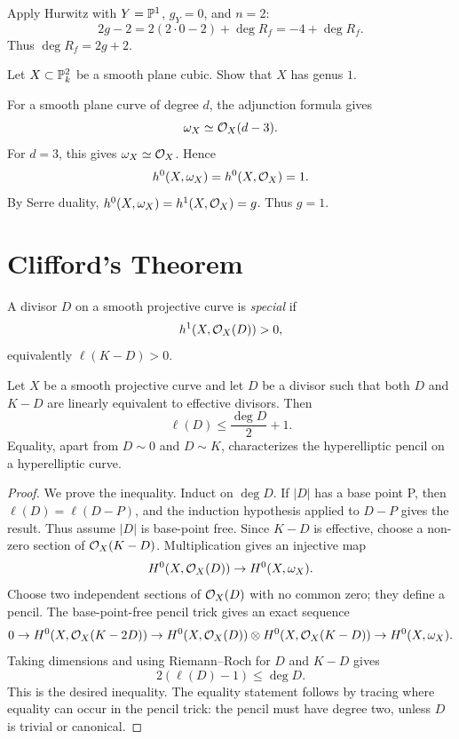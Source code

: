 \begin{solution}
Apply Hurwitz with \(Y=\mathbb{P}^1\), \(g_Y=0\), and \(n=2\):
\[
    2g-2=2(2\cdot0-2)+\deg R_f=-4+\deg R_f.
\]
Thus \(\deg R_f=2g+2\).
\end{solution}

\begin{exercise}\label{ex:plane-cubic-genus}
Let \(X\subset\mathbb{P}^2_k\) be a smooth plane cubic.  Show that \(X\) has genus
\(1\).
\end{exercise}

\begin{solution}
For a smooth plane curve of degree \(d\), the adjunction formula gives
\[
    \omega_X\simeq \mathcal{O}_X(d-3).
\]
For \(d=3\), this gives \(\omega_X\simeq\mathcal{O}_X\).  Hence
\[
    h^0(X,\omega_X)=h^0(X,\mathcal{O}_X)=1.
\]
By Serre duality, \(h^0(X,\omega_X)=h^1(X,\mathcal{O}_X)=g\).  Thus \(g=1\).
\end{solution}

\section{Clifford's Theorem}

\begin{definition}
A divisor \(D\) on a smooth projective curve is \emph{special} if
\[
    h^1(X,\mathcal{O}_X(D))>0,
\]
equivalently \(\ell(K-D)>0\).
\end{definition}

\begin{theorem}[Clifford]
Let \(X\) be a smooth projective curve and let \(D\) be a divisor such that
both \(D\) and \(K-D\) are linearly equivalent to effective divisors.  Then
\[
    \ell(D)\le \frac{\deg D}{2}+1.
\]
Equality, apart from \(D\sim0\) and \(D\sim K\), characterizes the
hyperelliptic pencil on a hyperelliptic curve.
\end{theorem}

\begin{proof}
We prove the inequality.  Induct on \(\deg D\).  If \(|D|\) has a base point
P, then \(\ell(D)=\ell(D-P)\), and the induction hypothesis applied to \(D-P\)
gives the result.  Thus assume \(|D|\) is base-point free.  Since \(K-D\) is
effective, choose a non-zero section of \(\mathcal{O}_X(K-D)\).  Multiplication gives
an injective map
\[
    H^0(X,\mathcal{O}_X(D))\to H^0(X,\omega_X).
\]
Choose two independent sections of \(\mathcal{O}_X(D)\) with no common zero; they
define a pencil.  The base-point-free pencil trick gives an exact sequence
\[
    0\to H^0(X,\mathcal{O}_X(K-2D))\to
    H^0(X,\mathcal{O}_X(D))\otimes H^0(X,\mathcal{O}_X(K-D))
    \to H^0(X,\omega_X).
\]
Taking dimensions and using Riemann--Roch for \(D\) and \(K-D\) gives
\[
    2(\ell(D)-1)\le \deg D.
\]
This is the desired inequality.  The equality statement follows by tracing
where equality can occur in the pencil trick: the pencil must have degree two,
unless \(D\) is trivial or canonical.
\end{proof}

